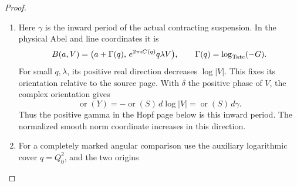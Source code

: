 \begin{proof}
\begin{enumerate}[label=\arabic*.]
\par\medskip\noindent\textbf{The closed positive parameter loop.}\enspace Write \(t_c\) for
the chosen nodal zero and put
\(h(t)=(t-t_c)/t\).  Since
\(\gamma(z,v+1)=\gamma(z,v)+\delta\), the smooth logarithmic
gluing changes by \((\log t)/(2\pi i)\delta\) under the
positive parameter deck.  The global ordinary deck is
\(-\log h(t)\delta/(2\pi i)\): near \(t=0\) it has exactly
that value up to a holomorphic unit logarithm, which extends on
the cap. More explicitly, write
\[
 D_{\rm ord}=-\frac{\log h(t)}{2\pi i}\delta,\qquad
 D_{\rm cap}=-\frac{\log(t-t_c)}{2\pi i}\delta.
\]
The second logarithm is holomorphic on the chosen smooth cap.
The directed gluing satisfies the exact compatibility
\[
 D_{\rm ord}\circ\Psi_v=\Psi_{v+1}\circ D_{\rm cap},
 \qquad
 D_{\rm ord}=D_{\rm cap}+\frac{\log t}{2\pi i}\delta .
\]
Here the \(D\)'s denote the respective translations from \(v\)
to \(v+1\). At the cusp use \(q=h(t)\), \(s=\log q/(2\pi i)\).
Then the actual periods are

\[
 \gamma(s,v)=\binom{\Gamma(q)}{C(q)+s+v},\qquad
 \delta=\binom01,
\]

with \(\Gamma,C\) holomorphic at zero, and the deck translates
by \(-s\delta\).  Its line-character multiplier \(q^{-1}\)
extends through the cusp: compose an inverse gamma lattice shift
with the bounded source translation \(\Gamma\) and the
nonvanishing multiplier \(\lambda e^{2\pi iC}\).  At every
other original fibre \(h\) is a unit.  This proves that the
glued family descends holomorphically over the punctured
\(\lambda\)-disc, with the stated positive closing map.

\item Here \(\gamma\) is the inward period of the actual contracting
suspension. In the physical Abel and line coordinates it is
\[
 B(a,V)=
 \bigl(a+\Gamma(q),\,e^{2\pi iC(q)}q\lambda V\bigr),
 \qquad \Gamma(q)=\log_{\rm Tate}(-G).
\]
For small \(q,\lambda\), its positive real direction decreases
\(\log|V|\). This fixes its orientation relative to the source
page. With \(\delta\) the positive phase of \(V\), the complex
orientation gives
\[
 \operatorname{or}(Y)
   =-\operatorname{or}(S)\,d\log|V|
   =\operatorname{or}(S)\,d\gamma .
\]
Thus the positive gamma in the Hopf page below is this inward
period. The normalized smooth norm coordinate increases in
this direction.

\item For a completely marked angular comparison use the auxiliary
logarithmic cover \(q=Q_0^2\), and the two origins


\end{enumerate}
\end{proof}
